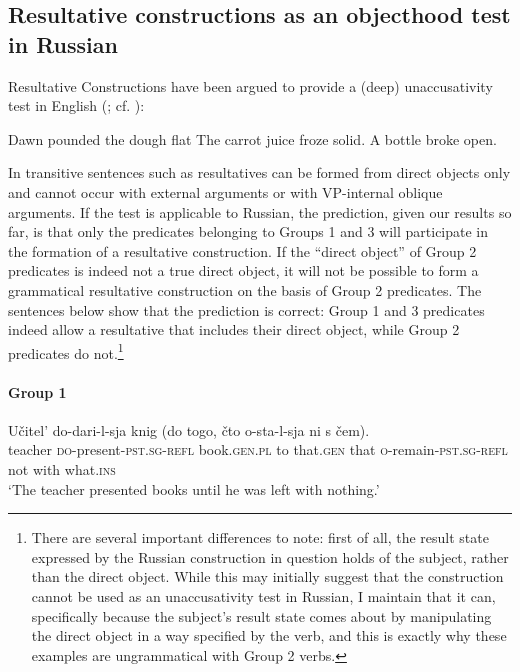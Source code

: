 \documentclass[output=paper,colorlinks,citecolor=brown,modfonts,nonflat]{langsci/langscibook}
\begin{document}
\subsection{Resultative constructions as an objecthood test in Russian}\label{sec:antonyuk:3.3}

Resultative Constructions have been argued to provide a (deep) unaccusativity test in English (\citealt{LevinRappaportHovav1995}; cf. \citealt{RappaportHovavLevin2001, Kratzer2005}):


\ea%
    \label{ex:antonyuk:28}
    \ea \label{ex:antonyuk:28a}
    Dawn pounded the dough flat \hfill \citep{Irvin2012}
    \ex \label{ex:antonyuk:28b}
    The carrot juice froze solid.
    \ex \label{ex:antonyuk:28c}
    A bottle broke open.
    \z
\z

In transitive sentences such as  resultatives can be formed from direct objects only and cannot occur with external arguments or with VP-internal oblique arguments. If the test is applicable to Russian, the prediction, given our results so far, is that only the predicates belonging to Groups 1 and 3 will participate in the formation of a resultative construction. If the “direct object” of Group 2 predicates is indeed not a true direct object, it will not be possible to form a grammatical resultative construction on the basis of Group 2 predicates. The sentences below show that the prediction is correct: Group 1 and 3 predicates indeed allow a resultative that includes their direct object, while Group 2 predicates do not.\footnote{There are several important differences to note: first of all, the result state expressed by the Russian construction in question holds of the subject, rather than the direct object. While this may initially suggest that the construction cannot be used as an unaccusativity test in Russian, I maintain that it can, specifically because the subject’s result state comes about by manipulating the direct object in a way specified by the verb, and this is exactly why these examples are ungrammatical with Group 2 verbs.}


\paragraph*{Group 1}
\ea%
    \label{ex:antonyuk:29}
    \gll    Učitel’ do-dari-l-sja knig (do togo, čto o-sta-l-sja ni s čem).\\
            teacher \textsc{do-}present\textsc{-pst.sg-refl} book\textsc{.gen.pl} to that\textsc{.gen} that \textsc{o-}remain\textsc{-pst.sg-refl} not with what\textsc{.ins}\\
    \glt    `The teacher presented books until he was left with nothing.'
    \z
\end{document}
